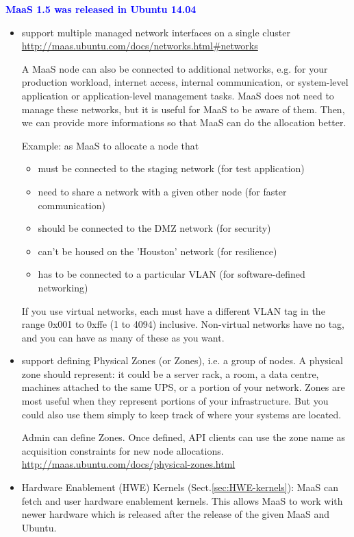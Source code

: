 \textcolor{blue}{\bf MaaS 1.5 was released in Ubuntu 14.04}
\begin{itemize}
  \item support multiple managed network interfaces on a single cluster
  \url{http://maas.ubuntu.com/docs/networks.html\#networks}
  
  A MaaS node can also be connected to additional networks, e.g. for your
  production workload, internet access, internal communication, or system-level
  application or application-level management tasks. MaaS does not need to
  manage these networks, but it is useful for MaaS to be aware of them. Then, we
  can provide more informations so that MaaS can do the allocation better.
  
  Example: as MaaS to allocate a node that
  \begin{itemize}
    \item must be connected to the staging network (for test application)
    \item need to share a network with a given other node (for faster
    communication)
    \item should be connected to the DMZ network (for security)
    \item can't be housed on the 'Houston' network (for resilience)
    \item has to be connected to a particular VLAN (for software-defined
    networking)
  \end{itemize}
  
  If you use virtual networks, each must have a different VLAN tag in the range
  0x001 to 0xffe (1 to 4094) inclusive. Non-virtual networks have no tag, and
  you can have as many of these as you want.  
  
  \item support defining Physical Zones (or Zones), i.e. a group of nodes.
  A physical zone should represent: it could be a server rack, a room, a data
  centre, machines attached to the same UPS, or a portion of your network. 
  Zones are most useful when they represent portions of your infrastructure. But
  you could also use them simply to keep track of where your systems are
  located. 
   
  
  Admin can define Zones. Once defined, API clients can use the zone name as
  acquisition constraints for new node allocations.
  \url{http://maas.ubuntu.com/docs/physical-zones.html}
  
  \item Hardware Enablement (HWE) Kernels (Sect.\ref{sec:HWE-kernels}): MaaS can
  fetch and user hardware enablement kernels. This allows MaaS to work with
  newer hardware which is released after the release of the given MaaS and
  Ubuntu.
  

\end{itemize}
